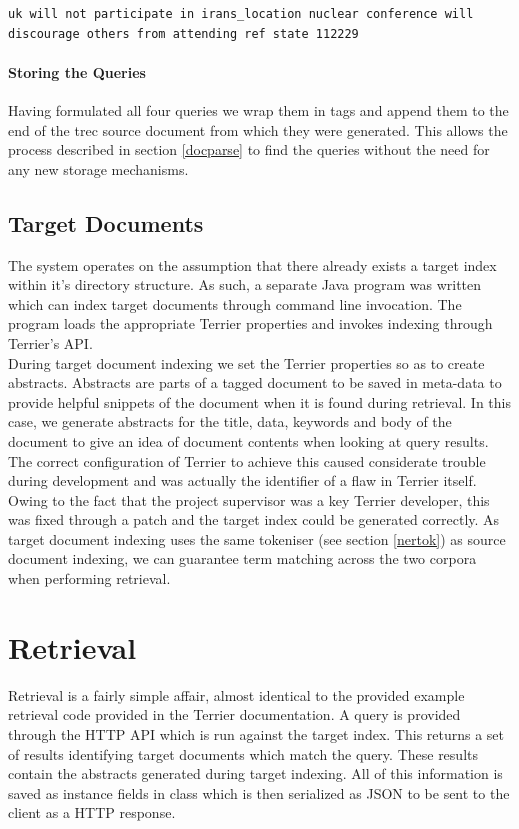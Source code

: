 \documentclass{l4proj}
\newenvironment{codelisting}{\captionsetup{type=listing}}{}
\begin{document}
\begin{codelisting}
\begin{verbatim}
uk will not participate in irans_location nuclear conference will discourage others from attending ref state 112229
\end{verbatim}
\label{code:subject_query}
\end{codelisting}

\paragraph{Storing the Queries}
Having formulated all four queries we wrap them in tags and append them to the end of the trec source document from which they were generated. This allows the process described in section \ref{docparse} to find the queries without the need for any new storage mechanisms.

\subsection{Target Documents}
The system operates on the assumption that there already exists a target index within it's directory structure.
As such, a separate Java program was written which can index target documents through command line invocation. The program loads the appropriate Terrier properties and invokes indexing through Terrier's API. \\ During target document indexing we set the Terrier properties so as to create abstracts. Abstracts are parts of a tagged document to be saved in meta-data to provide helpful snippets of the document when it is found during retrieval. In this case, we generate abstracts for the title, data, keywords and body of the document to give an idea of document contents when looking at query results.
The correct configuration of Terrier to achieve this caused considerate trouble during development and was actually the identifier of a flaw in Terrier itself. Owing to the fact that the project supervisor was a key Terrier developer, this was fixed through a patch and the target index could be generated correctly.
As target document indexing uses the same tokeniser (see section \ref{nertok}) as source document indexing, we can guarantee term matching across the two corpora when performing retrieval.

\section{Retrieval}
Retrieval is a fairly simple affair, almost identical to the provided example retrieval code provided in the Terrier documentation.
A query is provided through the HTTP API which is run against the target index. This returns a set of results identifying target documents which match the query. These results contain the abstracts generated during target indexing. All of this information is saved as instance fields in class which is then serialized as JSON to be sent to the client as a HTTP response.
\end{document}
